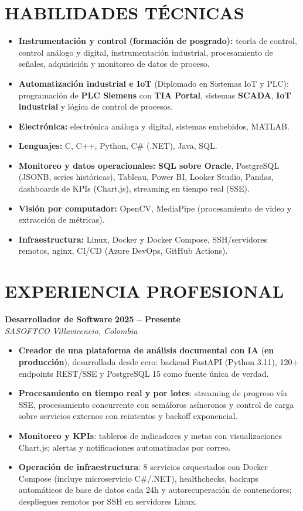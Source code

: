 \documentclass[letterpaper,10pt]{article}
\begin{document}
\section{HABILIDADES TÉCNICAS}
\begin{itemize}
    \item \textbf{Instrumentación y control (formación de posgrado):} teoría de control, control análogo y digital, instrumentación industrial, procesamiento de señales, adquisición y monitoreo de datos de proceso.
    \item \textbf{Automatización industrial e IoT} (Diplomado en Sistemas IoT y PLC): programación de \textbf{PLC Siemens} con \textbf{TIA Portal}, sistemas \textbf{SCADA}, \textbf{IoT industrial} y lógica de control de procesos.
    \item \textbf{Electrónica:} electrónica análoga y digital, sistemas embebidos, MATLAB.
    \item \textbf{Lenguajes:} C, C++, Python, C\# (.NET), Java, SQL.
    \item \textbf{Monitoreo y datos operacionales:} \textbf{SQL sobre Oracle}, PostgreSQL (JSONB, series históricas), Tableau, Power BI, Looker Studio, Pandas, dashboards de KPIs (Chart.js), streaming en tiempo real (SSE).
    \item \textbf{Visión por computador:} OpenCV, MediaPipe (procesamiento de video y extracción de métricas).
    \item \textbf{Infraestructura:} Linux, Docker y Docker Compose, SSH/servidores remotos, nginx, CI/CD (Azure DevOps, GitHub Actions).
\end{itemize}

\section{EXPERIENCIA PROFESIONAL}

\textbf{Desarrollador de Software} \hfill \textbf{2025 -- Presente} \\
\textit{SASOFTCO} \hfill \textit{Villavicencio, Colombia}
\begin{itemize}
    \item \textbf{Creador de una plataforma de análisis documental con IA} (\textbf{en producción}), desarrollada desde cero: backend FastAPI (Python 3.11), 120+ endpoints REST/SSE y PostgreSQL 15 como fuente única de verdad.
    \item \textbf{Procesamiento en tiempo real y por lotes}: streaming de progreso vía SSE, procesamiento concurrente con semáforos asíncronos y control de carga sobre servicios externos con reintentos y backoff exponencial.
    \item \textbf{Monitoreo y KPIs}: tableros de indicadores y metas con visualizaciones Chart.js; alertas y notificaciones automatizadas por correo.
    \item \textbf{Operación de infraestructura}: 8 servicios orquestados con Docker Compose (incluye microservicio C\#/.NET), healthchecks, backups automáticos de base de datos cada 24h y autorecuperación de contenedores; despliegues remotos por SSH en servidores Linux.
\end{itemize}
\end{document}
